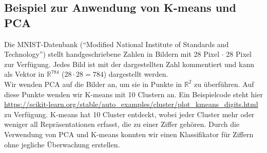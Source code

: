 \subsection{Beispiel zur Anwendung von K-means und PCA}
\label{subsec:vl13-3}

Die MNIST-Datenbank (``Modified National Institute of Standards and Technology'') stellt handgeschriebene Zahlen in Bildern mit 28 Pixel $\cdot$ 28 Pixel zur Verf\"ugung. Jedes Bild ist mit der dargestellten Zahl kommentiert und kann als Vektor in $\mathbb{R}^{784}$ ($28 \cdot 28 = 784$) dargestellt werden.\\
Wir wenden PCA auf die Bilder an, um sie in Punkte in $\mathbb{R}^{2}$ zu \"uberf\"uhren. Auf diese Punkte wenden wir K-means mit 10 Clustern an. Ein Beispielcode steht hier \url{https://scikit-learn.org/stable/auto_examples/cluster/plot_kmeans_digits.html} zu Verf\"ugung. K-means hat 10 Cluster entdeckt, wobei jeder Cluster mehr oder weniger all Repr\"asentationen erfasst, die zu einer Ziffer geh\"oren. Durch die Verwendung von PCA und K-means konnten wir einen Klassifikator für Ziffern ohne jegliche \"Uberwachung erstellen.